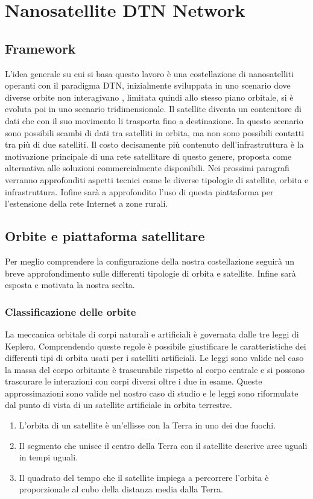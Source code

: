 \documentclass[12pt,a4paper,oneside]{book}
\begin{document}
		
	
	\chapter{Nanosatellite DTN Network}
		
		\section{Framework}	

		L'idea generale su cui si basa questo lavoro è una costellazione di nanosatelliti operanti con il paradigma DTN, inizialmente sviluppata in uno scenario dove diverse orbite non interagivano \cite{cello2014hot}, limitata quindi allo stesso piano orbitale, si è evoluta poi in uno scenario tridimensionale. Il satellite diventa un contenitore di dati che con il suo movimento li trasporta fino a destinazione. In questo scenario sono possibili scambi di dati tra satelliti in orbita, ma non sono possibili contatti tra più di due satelliti. Il costo decisamente più contenuto dell'infrastruttura è la motivazione principale di una rete satellitare di questo genere, proposta come alternativa alle soluzioni commercialmente disponibili. Nei prossimi paragrafi verranno approfonditi aspetti tecnici come le diverse tipologie di satellite, orbita e infrastruttura. Infine sarà a approfondito l'uso di questa piattaforma per l'estensione della rete Internet a zone rurali.
		
		\section{Orbite e piattaforma satellitare}
		Per meglio comprendere la configurazione della nostra costellazione seguirà un breve approfondimento sulle differenti tipologie di orbita e satellite. Infine sarà esposta e motivata la nostra scelta.

			\subsection{Classificazione delle orbite}
			La meccanica orbitale di corpi naturali e artificiali è governata dalle tre leggi di Keplero. Comprendendo queste regole è possibile giustificare le caratteristiche dei differenti tipi di orbita usati per i satelliti artificiali. Le leggi sono valide nel caso la massa del corpo orbitante è trascurabile rispetto al corpo centrale e si possono trascurare le interazioni con corpi diversi oltre i due in esame. Queste approssimazioni sono valide nel nostro caso di studio e le leggi sono riformulate dal punto di vista di un satellite artificiale in orbita terrestre.
			\begin{enumerate}
				\item L'orbita di un satellite è un'ellisse con la Terra in uno dei due fuochi.
				\item Il segmento che unisce il centro della Terra con il satellite descrive aree uguali in tempi uguali.
				\item Il quadrato del tempo che il satellite impiega a percorrere l'orbita è proporzionale al cubo della distanza media dalla Terra.
			\end{enumerate}
			
\end{document}
